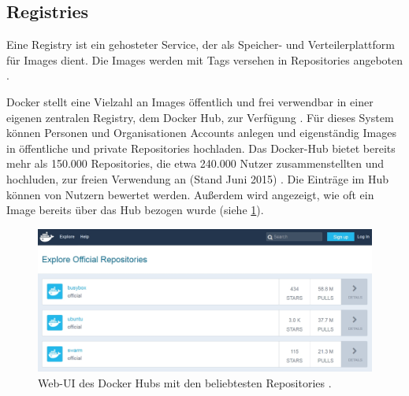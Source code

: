 \documentclass[../main.tex]{subfiles}
\begin{document}

		\subsection{Registries}
		\label{dockerRegistries}
      Eine Registry ist ein gehosteter Service, der als Speicher- und Verteilerplattform für Images dient. Die Images werden mit Tags versehen in Repositories angeboten \cite{dockerRegistry}. %

      Docker stellt eine Vielzahl an Images öffentlich und frei verwendbar in einer eigenen zentralen Registry, dem Docker Hub, zur Verfügung \cite[S.11]{dockerBook}\cite[S.3]{dockerSec1}\cite{dockerRegistry}. Für dieses System können Personen und Organisationen Accounts anlegen und eigenständig Images in öffentliche und private Repositories hochladen. Das Docker-Hub bietet bereits mehr als 150.000 Repositories, die etwa 240.000 Nutzer zusammenstellten und hochluden, zur freien Verwendung an (Stand Juni 2015) \cite[S.16]{slideshareDockercon15}. Die Einträge im Hub können von Nutzern bewertet werden. Außerdem wird angezeigt, wie oft ein Image bereits über das Hub bezogen wurde (siehe \fig \ref{fig:intro_registry}).

      \begin{figure}[h]
          \centering
          \includegraphics[width=1.0\textwidth]{./images/intro_registry.jpg}
          \caption{Web-\acrshort{UI} des Docker Hubs mit den beliebtesten Repositories \cite{dockerHub}.}
          \label{fig:intro_registry}
      \end{figure}
\end{document}
